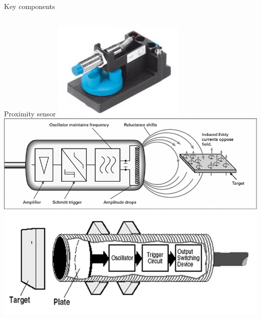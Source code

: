 \documentclass[presentation,aspectratio=1610]{beamer}
\begin{document}
\begin{frame}[label={sec:org46ecc84}]{Key components}
\begin{columns}
\begin{column}{0.33\columnwidth}
\begin{block}{Proximity sensor}
\includegraphics[width=0.6\linewidth]{../../figures/festo-proximity-sensor.jpg}\\
\includegraphics[width=0.99\linewidth]{../../figures/electroschematics-inductive-proximity-sensor.png}\\
\includegraphics[width=0.99\linewidth]{../../figures/automation-insight-operation_capacitive.jpg}
\end{block}
\end{column}
\end{columns}
\end{frame}
\end{document}
